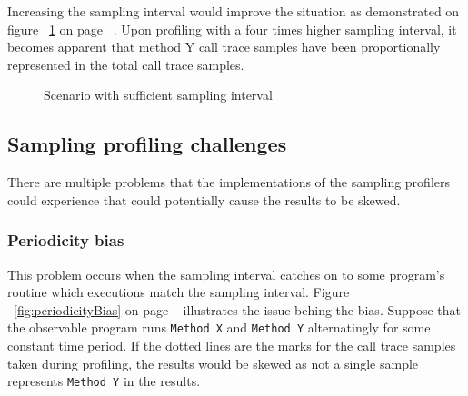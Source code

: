 \documentclass[..thesis.tex]{subfiles}
\begin{document}
Increasing the sampling interval would improve the situation as demonstrated on figure ~\ref{fig:highSampleCount} on page ~\pageref{fig:highSampleCount}. Upon profiling with a four times higher sampling interval, it becomes apparent that method Y call trace samples have been proportionally represented in the total call trace samples.

\begin{figure}[H]
\centering
{}
\caption{Scenario with sufficient sampling interval}
\label{fig:highSampleCount}
\end{figure}

\subsection{Sampling profiling challenges}
There are multiple problems that the implementations of the sampling profilers could experience that could potentially cause the results to be skewed.
\subsubsection{Periodicity bias}
This problem occurs when the sampling interval catches on to some program's routine which executions match the sampling interval. Figure ~\ref{fig:periodicityBias} on page ~\pageref{fig:periodicityBias} illustrates the issue behing the bias. Suppose that the observable program runs \texttt{Method X} and \texttt{Method Y} alternatingly for some constant time period. If the dotted lines are the marks for the call trace samples taken during profiling, the results would be skewed as not a single sample represents \texttt{Method Y} in the results. 
\end{document}
